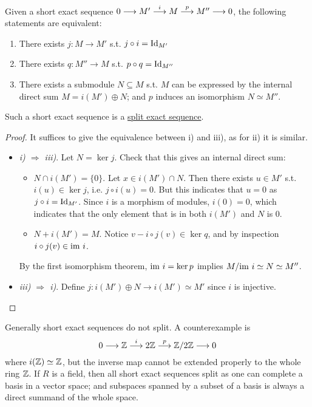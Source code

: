 \begin{proposition}\label{prop:criterion for split}
    Given a short exact sequence $0 \longrightarrow M' \overset{i}{\longrightarrow} M \overset{p}{\longrightarrow} M'' \longrightarrow 0$, the following statements are equivalent:
    \begin{enumerate}[label=\roman*)]
        \item There exists $j: M \to M'$ s.t. $j \circ i = \mathrm{Id}_{M'}$
        \item There exists $q: M'' \to M$ s.t. $p \circ q = \mathrm{Id}_{M''}$
        \item There exists a submodule $N \subseteq M$ s.t. $M$ can be expressed by the internal direct sum $M = i(M') \oplus N$; and $p$ induces an isomorphism $N \simeq M''$.
    \end{enumerate}
    Such a short exact sequence is a \underline{split exact sequence}.
\end{proposition}

\begin{proof}
    It suffices to give the equivalence between i) and iii), as for ii) it is similar.
    \begin{itemize}
        \item \emph{i) $\Rightarrow$ iii)}. Let $N = \ker j$. Check that this gives an internal direct sum:
            \begin{itemize}
                \item $N \cap i(M') = \{0\}$. Let $x \in i(M') \cap N$. Then there exists $u \in M'$ s.t. $i(u) \in \ker j$, i.e. $j\circ i(u) = 0$. But this indicates that $u = 0$ as $j \circ i = \mathrm{Id}_{M'}$. Since $i$ is a morphism of modules, $i(0) = 0$, which indicates that the only element that is in both $i(M')$ and $N$ is 0.
                \item $N + i(M') = M$. Notice $v - i \circ j(v) \in \ker q$, and by inspection $i\circ j(v) \in \mathrm{im}\  i$.
            \end{itemize}
            By the first isomorphism theorem, $\mathrm{im}\  i = \ker p$ implies $M / \mathrm{im}\  i \simeq N \simeq M''$.
        \item \emph{iii) $\Rightarrow$ i)}. Define $j: i(M') \oplus N \to i(M') \simeq M'$ since $i$ is injective.
    \end{itemize}
\end{proof}

\begin{remark}
    Generally short exact sequences do not split. A counterexample is
    \[
        0 \longrightarrow \mathbb{Z} \overset{i}{\longrightarrow} 2\mathbb{Z} \overset{p}{\longrightarrow} \mathbb{Z}/2\mathbb{Z} \longrightarrow 0
    \]
    where $i(\mathbb{Z}) \simeq \mathbb{Z}$, but the inverse map cannot be extended properly to the whole ring $\mathbb{Z}$. If $R$ is a field, then all short exact sequences split as one can complete a basis in a vector space; and subspaces spanned by a subset of a basis is always a direct summand of the whole space.
\end{remark}

